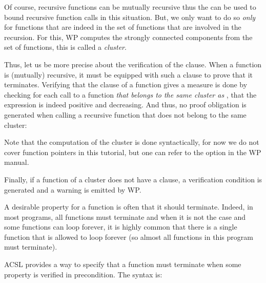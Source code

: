Of course, recursive functions can be mutually recursive thus the
 can be used to bound recursive function calls in this
situation. But, we only want to do so {\em only} for functions that are indeed
in the set of functions that are involved in the recursion. For this, WP
computes the strongly connected components from the set of functions, this is
called a {\em cluster}.

Thus, let us be more precise about the verification of the 
clause. When a function is (mutually) recursive, it must be equipped with such
a clause to prove that it terminates. Verifying that the 
clause of a function  gives a measure is done by checking for each
call to a function {\em that belongs to the same cluster as },
that the expression is indeed positive and decreasing. And thus, no proof
obligation is generated when calling a recursive function that does not belong
to the same cluster:




\begin{Information}
  Note that the computation of the cluster is done syntactically, for now we do
  not cover function pointers in this tutorial, but one can refer to the option
   in the WP manual.
\end{Information}


Finally, if a function of a cluster does not have a 
clause, a  verification condition is generated
and a warning is emitted by WP.









A desirable property for a function is often that it should terminate. Indeed,
in most programs, all functions must terminate and when it is not the case and
some functions can loop forever, it is highly common that there is a single
function that is allowed to loop forever (so almost all functions in this
program must terminate).






ACSL provides a way to specify that a function must terminate when some property
is verified in precondition. The syntax is:



